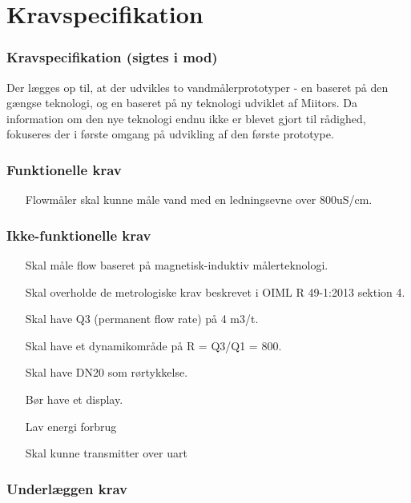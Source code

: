 

\chapter{Kravspecifikation}




\subsection{ Kravspecifikation (sigtes i mod)}
Der lægges op til, at der udvikles to vandmålerprototyper - en baseret på den gængse teknologi, og en baseret på ny teknologi udviklet af Miitors. Da information om den nye teknologi endnu ikke er blevet gjort til rådighed, fokuseres der i første omgang på udvikling af den første prototype.



\subsection{Funktionelle krav}
\begin{itemize}
\item[Flowmåler skal kunne måle vand med en ledningsevne over 800uS/cm. \citep{rentvand}]	
\end{itemize}


\subsection{Ikke-funktionelle krav}
\begin{itemize}
\item[Skal måle flow baseret på magnetisk-induktiv målerteknologi.]
\item[Skal overholde de metrologiske krav beskrevet i OIML R 49-1:2013 sektion 4.]
\item[Skal have Q3 (permanent flow rate) på 4 m3/t.]
\item[Skal have et dynamikområde på R = Q3/Q1 = 800.]
\item[Skal have DN20 som rørtykkelse.]
\item[Bør have et display.]
\item[Lav energi forbrug]
\item[Skal kunne transmitter over uart]
\end{itemize}





\subsection{Underlæggen krav}


